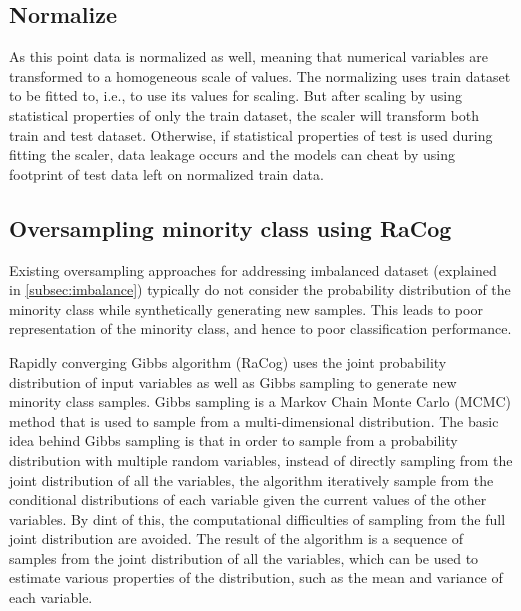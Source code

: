 \documentclass{article}
\begin{document}
\hypertarget{normalize}{%
\subsection{Normalize}\label{normalize}}

As this point data is normalized as well, meaning that numerical
variables are transformed to a homogeneous scale of values. The
normalizing uses train dataset to be fitted to, i.e., to use its values
for scaling. But after scaling by using statistical properties of only
the train dataset, the scaler will transform both train and test
dataset. Otherwise, if statistical properties of test is used during
fitting the scaler, data leakage occurs and the models can cheat by
using footprint of test data left on normalized train data.

\hypertarget{oversampling-minority-class-using-racog}{%
\subsection{\texorpdfstring{Oversampling minority class using RaCog
\label{subsec:racog}}{Oversampling minority class using RaCog }}\label{oversampling-minority-class-using-racog}}

Existing oversampling approaches for addressing imbalanced dataset
(explained in \ref{subsec:imbalance}) typically do not consider the
probability distribution of the minority class while synthetically
generating new samples. This leads to poor representation of the
minority class, and hence to poor classification performance.

Rapidly converging Gibbs algorithm (RaCog) uses the joint probability
distribution of input variables as well as Gibbs sampling to generate
new minority class samples. Gibbs sampling is a Markov Chain Monte Carlo
(MCMC) method \cite{bishop} that is used to sample from a
multi-dimensional distribution. The basic idea behind Gibbs sampling is
that in order to sample from a probability distribution with multiple
random variables, instead of directly sampling from the joint
distribution of all the variables, the algorithm iteratively sample from
the conditional distributions of each variable given the current values
of the other variables. By dint of this, the computational difficulties
of sampling from the full joint distribution are avoided. The result of
the algorithm is a sequence of samples from the joint distribution of
all the variables, which can be used to estimate various properties of
the distribution, such as the mean and variance of each variable.
\end{document}
